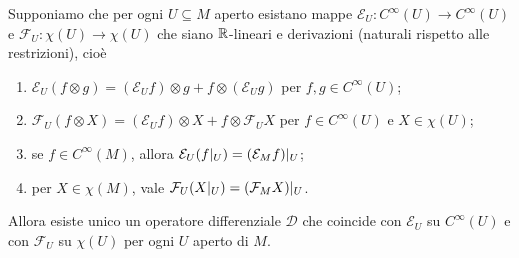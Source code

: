 \begin{theorem} \label{thm:EsistenzaOperatoriDifferenziali} %
	Supponiamo che per ogni $U\subseteq M$ aperto esistano mappe $\mathcal E_U : C^\infty(U) \to C^\infty(U)$ e $\mathcal F_U : \chi(U) \to \chi(U)$ che siano $\mathbb R$-lineari e derivazioni (naturali rispetto alle restrizioni), cioè
	\begin{enumerate}
		\item $\mathcal E_U(f\otimes g) = (\mathcal E_U f) \otimes g + f \otimes (\mathcal E_U g)$ per $f,g\in C^\infty(U)$; \label{eod:LeibnitzPerE}
		\item $\mathcal F_U(f\otimes X) = (\mathcal E_U f) \otimes X + f\otimes \mathcal F_U X$ per $f\in C^\infty(U)$ e $X\in\chi(U)$; \label{eod:LeibnitzPerF}
		\item se $f\in C^\infty(M)$, allora $\mathcal E_U(f|_ U) = (\mathcal E_M f)|_ U$; \label{eod:LocalitaPerE}
		\item per $X\in\chi(M)$, vale $\mathcal F_U(X|_ U) = (\mathcal F_M X)|_ U$. \label{eod:LocalitaPerF}
	\end{enumerate}
	Allora esiste unico un operatore differenziale $\mathcal D$ che coincide con $\mathcal E_U$ su $C^\infty(U)$ e con $\mathcal F_U$ su $\chi(U)$ per ogni $U$ aperto di $M$.

\end{theorem}


